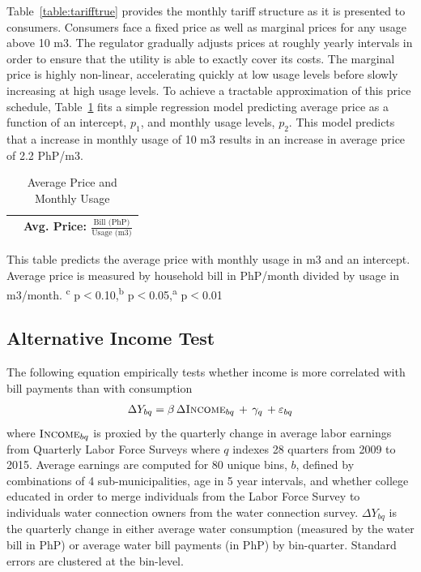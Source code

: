 \documentclass[12pt,table]{article}
\begin{document}
Table~\ref{table:tarifftrue} provides the monthly tariff structure as it is presented to consumers.  Consumers face a fixed price as well as marginal prices for any usage above 10 m3.  The regulator gradually adjusts prices at roughly yearly intervals in order to ensure that the utility is able to exactly cover its costs.  The marginal price is highly non-linear, accelerating quickly at low usage levels before slowly increasing at high usage levels.  To achieve a tractable approximation of this price schedule, Table~\ref{table:tcd_predict} fits a simple regression model predicting average price as a function of an intercept, $p_1$, and monthly usage levels, $p_2$.  This model predicts that a increase in monthly usage of 10 m3 results in an increase in average price of 2.2 PhP/m3.  

\begin{table}[H]
\small
\centering
\caption{Average Price and Monthly Usage}\label{table:tcd_predict}
\begin{threeparttable}
\begin{tabular}{lc}
\toprule
& \small Avg. Price: $\frac{\text{Bill (PhP)}}{\text{Usage (m3)}}$    \\
\midrule 

\bottomrule
\end{tabular}
\begin{tablenotes}
\item
\footnotesize
This table predicts the average price with monthly usage in m3 and an intercept.  Average price is measured by household bill in PhP/month divided by usage in m3/month.  \textsuperscript{c} p$<$0.10,\textsuperscript{b} p$<$0.05,\textsuperscript{a} p$<$0.01
\end{tablenotes}
\end{threeparttable}
\end{table}




\subsection{Alternative Income Test}\label{appendix:alternativeincome}

The following equation empirically tests whether income is more correlated with bill payments than with consumption
\begin{align*}
\Delta Y_{bq} = \beta\, \Delta \textsc{Income}_{bq} \,+\, \gamma_q \,+\varepsilon_{bq}
\end{align*}
where $\textsc{Income}_{bq}$ is proxied by the quarterly change in average labor earnings from Quarterly Labor Force Surveys where $q$ indexes 28 quarters from 2009 to 2015.  Average earnings are computed for 80 unique bins, $b$, defined by combinations of 4 sub-municipalities, age in 5 year intervals, and whether college educated in order to merge individuals from the Labor Force Survey to individuals water connection owners from the water connection survey.  $\Delta Y_{bq}$ is the quarterly change in either average water consumption (measured by the water bill in PhP) or average water bill payments (in PhP) by bin-quarter.  Standard errors are clustered at the bin-level.
\end{document}
